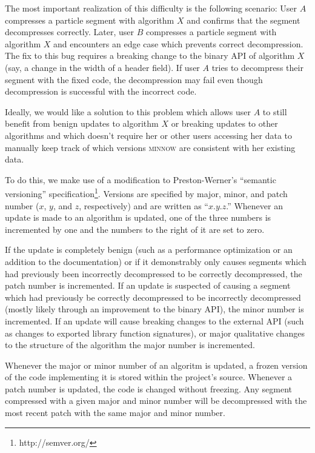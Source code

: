 \documentclass[numberedappendix,apj]{emulateapj}
\begin{document}
The most important realization of this difficulty is the following scenario:
User $A$ compresses a particle
segment with algorithm $X$ and confirms that the segment decompresses
correctly. Later, user $B$ compresses a particle segment with algorithm $X$ and
encounters an edge case which prevents correct decompression. The fix to this
bug requires a breaking change to the binary API of algorithm $X$ (say,
a change in the width of a header field). If user $A$ tries to decompress
their segment with the fixed code, the decompression may fail even though
decompression is successful with the incorrect code.

Ideally, we would like a solution to this problem which allows user $A$ to still
benefit from benign updates to algorithm $X$ or breaking updates to other
algorithms and which doesn't require her or other users accessing her data to
manually keep track of which versions \textsc{minnow} are consistent with her
existing data.

To do this, we make use of a modification to Preston-Werner's ``semantic
versioning'' specification\footnote{http://semver.org/}. Versions are specified
by major, minor, and patch number ($x$, $y$, and $z$, respectively) and are
written as ``$x.y.z$.'' Whenever an update is made to an algorithm is updated,
one of the three numbers is incremented by one and the numbers to the right of
it are set to zero.

If the update is completely benign (such as a performance optimization or
an addition to the documentation) or if it demonstrably only causes
segments which had previously been incorrectly decompressed to be correctly
decompressed, the patch number is incremented. If an update is suspected of
causing a segment which had previously be correctly decompressed to be
incorrectly decompressed (mostly likely through an improvement to the binary
API), the minor number is incremented. If an update will cause breaking changes
to the external API (such as changes to exported library function signatures),
or major qualitative changes to the structure of the algorithm
the major number is incremented.

Whenever the major or minor number of an algoritm is updated, a frozen version
of the code implementing it is stored within the project's source. Whenever a
patch number is updated, the code is changed without freezing. Any segment
compressed with a given major and minor number will be decompressed with the
most recent patch with the same major and minor number.
\end{document}
